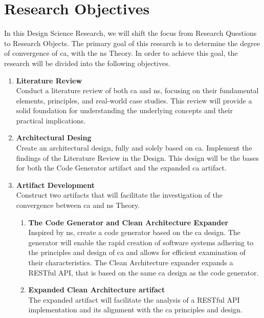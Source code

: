 \section{Research Objectives} \label{sec_research_objectives}

In this Design Science Research, we will shift the focus from Research Questions to
Research Objects. The primary goal of this research is to determine the degree of
convergence of \gls{ca}, with the \gls{ns} Theory. In order to achieve this goal, the
research will be divided into the following objectives. 

\begin{enumerate}
    \item \textbf{Literature Review} \\
    Conduct a literature review of both \gls{ca} and \gls{ns}, focusing on their
    fundamental elements, principles, and real-world case studies. This review will
    provide a solid foundation for understanding the underlying concepts and their
    practical implications.
    
    \item \textbf{Architectural Desing} \\
    Create an architectural design, fully and solely based on \gls{ca}. Implement the
    findings of the Literature Review in the Design. This design will be the bases for
    both the Code Generator artifact and the expanded \gls{ca} artifact.

    \item \textbf{Artifact Development} \\
    Construct two artifacts that will facilitate the investigation of the convergence
    between \gls{ca} and \gls{ns} Theory.
    \begin{enumerate}[label*={\arabic*.}]
        
        \item \textbf{The Code Generator and Clean Architecture Expander} \\
        Inspired by \gls{ns}, create a code generator based on the \gls{ca} design. The
        generator will enable the rapid creation of software systems adhering to the
        principles and design of \gls{ca} and allows for efficient examination
        of their characteristics. The Clean Architecture expander expands a RESTful API,
        that is based on the same \gls{ca} design as the code generator. 
        
        \item \textbf{Expanded Clean Architecture artifact} \\
        The expanded artifact will facilitate the analysis of a RESTful API implementation
        and its alignment with the \gls{ca} principles and design.
        

\end{enumerate}
\end{enumerate}
